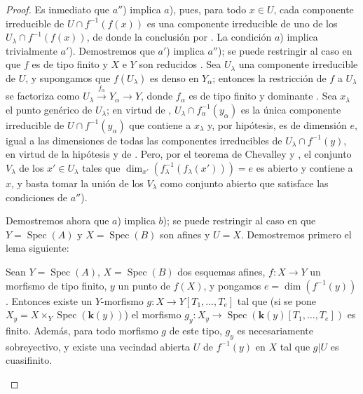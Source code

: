 \begin{proof}
Es inmediato que $a''$) implica $a$), pues, para todo $x\in U$, cada componente irreducible de $U\cap f^{-1}(f(x))$ es una componente irreducible de uno de los $U_\lambda\cap f^{-1}(f(x))$, de donde la conclusión por .
La condición $a$) implica trivialmente $a'$).
Demostremos que $a'$) implica $a''$); se puede restringir al caso en que $f$ es de tipo finito y $X$ e $Y$ son reducidos .
Sea $U_\lambda$ una componente irreducible de $U$, y supongamos que $f(U_\lambda)$ es denso en $Y_\alpha$; entonces la restricción de $f$ a $U_\lambda$ se factoriza como $U_\lambda\xrightarrow{f_\alpha}Y_\alpha\to Y$, donde $f_\alpha$ es de tipo finito y dominante .
Sea $x_\lambda$ el punto genérico de $U_\lambda$; en virtud de , $U_\lambda\cap f_\alpha^{-1}(y_\alpha)$ es la única componente irreducible de $U\cap f^{-1}(y_\alpha)$ que contiene a $x_\lambda$ y, por hipótesis, es de dimensión $e$, igual a las dimensiones de todas las componentes irreducibles de $U_\lambda\cap f^{-1}(y)$, en virtud de la hipótesis y de .
Pero, por el teorema de Chevalley  y , el conjunto $V_\lambda$ de los $x'\in U_\lambda$ tales que $\dim_{x'}(f_\lambda^{-1}(f_\lambda(x')))=e$ es abierto y contiene a $x$, y basta tomar la unión de los $V_\lambda$ como conjunto abierto que satisface las condiciones de $a''$).

Demostremos ahora que $a$) implica $b$); se puede restringir al caso en que $Y=\operatorname{Spec}(A)$ y $X=\operatorname{Spec}(B)$ son afines y $U=X$.
Demostremos primero el lema siguiente:

\begin{lemma}[13.3.1.1]
\label{IV.13.3.1.1}
Sean $Y=\operatorname{Spec}(A)$, $X=\operatorname{Spec}(B)$ dos esquemas afines, $f:X\to Y$ un morfismo de tipo finito, $y$ un punto de $f(X)$, y pongamos $e=\dim(f^{-1}(y))$.
Entonces existe un $Y$-morfismo $g:X\to Y[T_1,\ldots,T_e]$ tal que (si se pone $X_y=X\times_Y\operatorname{Spec}(\boldsymbol{k}(y))$) el morfismo $g_y:X_y\to\operatorname{Spec}(\boldsymbol{k}(y)[T_1,\ldots,T_e])$ es finito.
Además, para todo morfismo $g$ de este tipo, $g_y$ es necesariamente sobreyectivo, y existe una vecindad abierta $U$ de $f^{-1}(y)$ en $X$ tal que $g|U$ es cuasifinito.
\end{lemma}


\end{proof}
